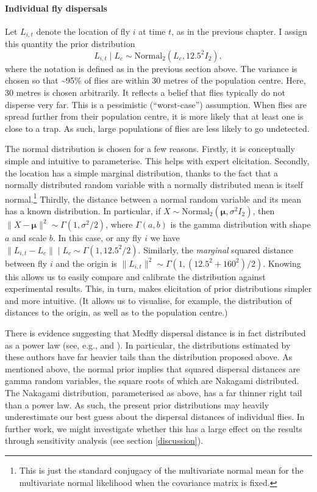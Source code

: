 \documentclass[
  oneside]{book}
\begin{document}
\hypertarget{individual-fly-dispersals}{%
\paragraph{Individual fly dispersals}\label{individual-fly-dispersals}}

Let \(L_{i, t}\) denote the location of fly \(i\) at time \(t\), as in the previous chapter. I assign this quantity the prior distribution \[L_{i, t} \mid L_c \sim \mathrm {Normal}_2 (L_c, 12.5^2 I_2),\] where the notation is defined as in the previous section above. The variance is chosen so that \textasciitilde95\% of flies are within 30 metres of the population centre. Here, 30 metres is chosen arbitrarily. It reflects a belief that flies typically do not disperse very far. This is a pessimistic (``worst-case'') assumption. When flies are spread further from their population centre, it is more likely that at least one is close to a trap. As such, large populations of flies are less likely to go undetected.

The normal distribution is chosen for a few reasons. Firstly, it is conceptually simple and intuitive to parameterise. This helps with expert elicitation. Secondly, the location has a simple marginal distribution, thanks to the fact that a normally distributed random variable with a normally distributed mean is itself normal.\footnote{This is just the standard conjugacy of the multivariate normal mean for the multivariate normal likelihood when the covariance matrix is fixed.} Thirdly, the distance between a normal random variable and its mean has a known distribution. In particular, if \(X \sim \mathrm{Normal}_2(\pmb \mu, \sigma^2 I_2)\), then \(\lVert X - \pmb \mu \rVert^2 \sim \Gamma(1, \sigma^2/2)\), where \(\Gamma(a, b)\) is the gamma distribution with shape \(a\) and scale \(b\). In this case, or any fly \(i\) we have \(\lVert L_{i,t} - L_c \rVert \mid L_c \sim \Gamma(1, 12.5^2/2)\). Similarly, the \emph{marginal} squared distance between fly \(i\) and the origin is \(\lVert L_{i, t} \rVert^2 \sim \Gamma(1, (12.5^2 + 160^2) / 2)\). Knowing this allows us to easily compare and calibrate the distribution against experimental results. This, in turn, makes elicitation of prior distributions simpler and more intuitive. (It allows us to visualise, for example, the distribution of distances to the origin, as well as to the population centre.)

There is evidence suggesting that Medfly dispersal distance is in fact distributed as a power law (see, e.g., \citet{meats2005} and \citet{plant1991}). In particular, the distributions estimated by these authors have far heavier tails than the distribution proposed above. As mentioned above, the normal prior implies that squared dispersal distances are gamma random variables, the square roots of which are Nakagami distributed. The Nakagami distribution, parameterised as above, has a far thinner right tail than a power law. As such, the present prior distributions may heavily underestimate our best guess about the dispersal distances of individual flies. In further work, we might investigate whether this has a large effect on the results through sensitivity analysis (see section \ref{discussion}).
\end{document}
